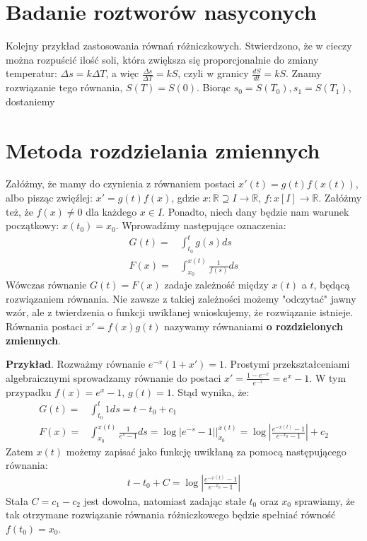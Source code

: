 \section{Badanie roztworów nasyconych}
Kolejny przykład zastosowania równań różniczkowych. Stwierdzono, że w cieczy można rozpuścić ilość soli, która zwiększa się proporcjonalnie do zmiany temperatur: $\Delta s=k\Delta T$, a więc $\frac{\Delta s}{\Delta T}=kS$, czyli w granicy $\frac{dS}{dt}=kS$. Znamy rozwiązanie tego równania, $S\left( T \right) =S\left( 0 \right) $. Biorąc $s_0=S(T_0), s_1=S(T_1)$, dostaniemy


\section{Metoda rozdzielania zmiennych}
Załóżmy, że mamy do czynienia z równaniem postaci $x'(t) = g(t)f\left(x(t)\right)$, albo pisząc zwięźlej: $x' = g(t)f(x)$, gdzie $x : \mathbb{R} \supseteq I \to \mathbb{R}$, $f : x\left[I\right] \to \mathbb{R}$. Załóżmy też, że $f(x) \neq 0$ dla każdego $x \in I$. Ponadto, niech dany będzie nam warunek początkowy: $x(t_0) = x_0$. Wprowadźmy następujące oznaczenia:
\begin{align*}
	G(t) =& \int_{t_0}^{t} g(s) ds \\
	F(x) =& \int_{x_0}^{x(t)} \frac{1}{f(s)} ds
\end{align*}
Wówczas równanie $G(t) = F(x)$ zadaje zależność między $x(t)$ a $t$, będącą rozwiązaniem równania. Nie zawsze z takiej zależności możemy "odczytać" jawny wzór, ale z twierdzenia o funkcji uwikłanej wnioskujemy, że rozwiązanie istnieje. Równania postaci $x' = f(x)g(t)$ nazywamy równaniami \textbf{o rozdzielonych zmiennych}. 

\textbf{Przykład}. Rozważmy równanie $e^{-x}(1+x')=1$. Prostymi przekształceniami algebraicznymi sprowadzamy równanie do postaci $x' = \frac{1-e^{-x}}{e^{-x}} = e^x-1$. W tym przypadku $f(x) = e^x-1$, $g(t) = 1$. Stąd wynika, że:
\begin{align*}
	G(t) =& \int_{t_0}^{t} 1 ds = t-t_0+c_1 \\
	F(x) =& \int_{x_0}^{x(t)} \frac{1}{e^s-1} ds = \log|e^{-s}-1|\bigg|_{x_0}^{x(t)} = \log \left| \frac{e^{-x(t)}-1}{e^{-x_0}-1}\right| +c_2
\end{align*}
Zatem $x(t)$ możemy zapisać jako funkcję uwikłaną za pomocą następującego równania:
\begin{align*}
	t-t_0 + C = \log\left|\frac{e^{-x(t)}-1}{e^{-x_0}-1}\right|
\end{align*}
Stała $C = c_1-c_2$ jest dowolna, natomiast zadając stałe $t_0$ oraz $x_0$ sprawiamy, że tak otrzymane rozwiązanie równania różniczkowego będzie spełniać równość $f(t_0) = x_0$.
